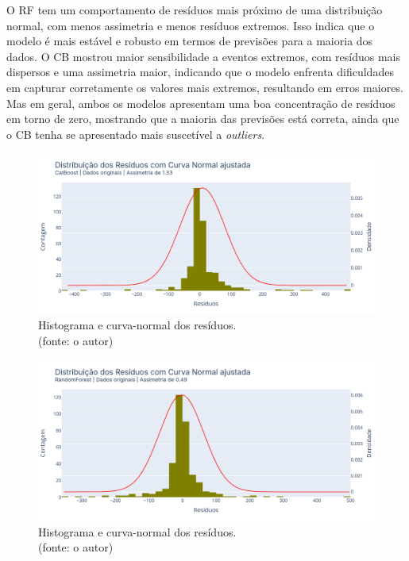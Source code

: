 O RF tem um comportamento de resíduos mais próximo de uma distribuição normal, com menos assimetria e menos resíduos extremos. Isso indica que o modelo é mais estável e robusto em termos de previsões para a maioria dos dados. O CB mostrou maior sensibilidade a eventos extremos, com resíduos mais dispersos e uma assimetria maior, indicando que o modelo enfrenta dificuldades em capturar corretamente os valores mais extremos, resultando em erros maiores. Mas em geral, ambos os modelos apresentam uma boa concentração de resíduos em torno de zero, mostrando que a maioria das previsões está correta, ainda que o CB tenha se apresentado mais suscetível a \textit{outliers}.

\begin{figure}[!h]
\centering
\includegraphics[scale=0.33]{Figuras/jequiti/resultados/CB_WFV_ORIG_RESID_x_CURVA_NORMAL.png}
\caption{Histograma e curva-normal dos resíduos.\\(fonte: o autor)}
\label{fig:jequiti_CB_WFV_ORIG_RESID_x_CURVA_NORMAL}
\end{figure}

\begin{figure}[!h]
\centering
\includegraphics[scale=0.33]{Figuras/jequiti/resultados/RF_WFV_ORIG_RESID_x_CURVA_NORMAL.png}
\caption{Histograma e curva-normal dos resíduos.\\(fonte: o autor)}
\label{fig:jequiti_RF_WFV_ORIG_RESID_x_CURVA_NORMAL}
\end{figure}
\clearpage


